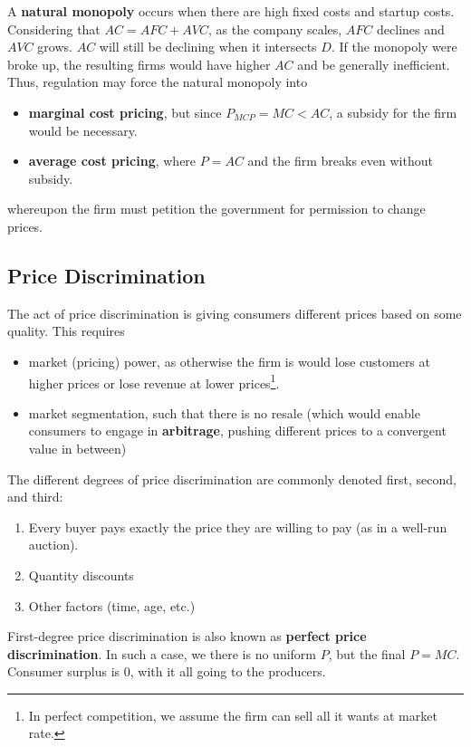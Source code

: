 \documentclass{article}
\begin{document}
A \textbf{natural monopoly} occurs when there are high fixed costs and startup costs. Considering that $AC=AFC+AVC$, as the company scales, $AFC$ declines and $AVC$ grows. $AC$ will still be declining when it intersects $D$. If the monopoly were broke up, the resulting firms would have higher $AC$ and be generally inefficient. Thus, regulation may force the natural monopoly into
\begin{itemize}
    \item \textbf{marginal cost pricing}, but since $P_{MCP}=MC<AC$, a subsidy for the firm would be necessary.
    \item \textbf{average cost pricing}, where $P=AC$ and the firm breaks even without subsidy.
\end{itemize}
whereupon the firm must petition the government for permission to change prices.

\subsection{Price Discrimination}
The act of price discrimination is giving consumers different prices based on some quality. This requires

\begin{itemize}
	\item market (pricing) power, as otherwise the firm is would lose customers at higher prices or lose revenue at lower prices\footnote{In perfect competition, we assume the firm can sell all it wants at market rate.}.
	\item market segmentation, such that there is no resale (which would enable consumers to engage in \textbf{arbitrage}, pushing different prices to a convergent value in between)
\end{itemize}

The different degrees of price discrimination are commonly denoted first, second, and third:
\begin{enumerate}
	\item Every buyer pays exactly the price they are willing to pay (as in a well-run auction).
	\item Quantity discounts
	\item Other factors (time, age, etc.)
\end{enumerate}
First-degree price discrimination is also known as \textbf{perfect price discrimination}. In such a case, we there is no uniform $P$, but the final $P=MC$. Consumer surplus is $0$, with it all going to the producers.
\end{document}
